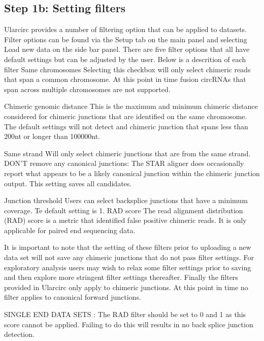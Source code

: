 \documentclass[12pt]{article}\usepackage[]{graphicx}\usepackage[]{color}
\begin{document}
\subsection{Step 1b: Setting filters} \label{sec:Step1b}
Ularcirc provides a number of filtering option that can be applied to datasets. Filter options can be found via the Setup tab on the main panel and selecting Load new data on the side bar panel. There are five filter options that all have default settings but can be adjusted by the user. Below is a descrition of each filter
 Same chromosomes  Selecting this checkbox will only select chimeric reads that span a common chromosome. At this point in time fusion circRNAs that span across multiple chromosomes are not supported. \par
Chimeric genomic distance   This is the maximum and minimum chimeric distance considered for chimeric junctions that are identified on the same chromosome. The default settings will not detect and chimeric junction that spans less than 200nt or longer than 100000nt. \par
 Same strand Will only select chimeric junctions that are from the same strand.
 DON'T remove any canonical junctions: The STAR aligner does occasionally report what appears to be a likely canonical junction within the chimeric junction output. This setting saves all candidates. \par
 Junction threshold Users can select backsplice junctions that have a minimum coverage. Te default setting is 1.
 RAD score The read alignment distribution (RAD) score is a metric that identified false positive chimeric reads. It is only applicable for paired end sequencing data. \par

It is important to note that the setting of these filters prior to uploading a new data set will not save  any chimeric junctions that do not pass filter settings. For exploratory analysis users may wish to relax some filter settings prior to saving and then explore more stringent filter settings thereafter. Finally the filters provided in Ularcirc only apply to chimeric junctions. At this point in time no filter applies to canonical forward junctions. \par

SINGLE END DATA SETS : The RAD filter should be set to 0 and 1 as this score cannot be applied. Failing to do this will results in no back splice junction detection.


\end{document}
